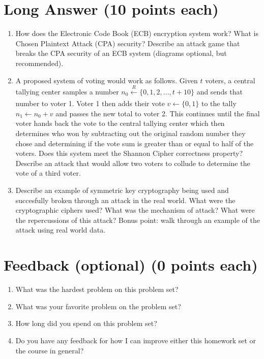\documentclass[11pt]{article}
\begin{document}
\section*{Long Answer (10 points each)}

\begin{enumerate}
    \item How does the Electronic Code Book (ECB) encryption system work? What is Chosen Plaintext Attack (CPA) security? Describe an attack game that breaks the CPA security of an ECB system (diagrams optional, but recommended).
    \item A proposed system of voting would work as follows.  Given \(t\) voters, a central tallying center samples a number \(n_0 \xleftarrow[]{R} \{0, 1, 2, ... , t + 10\}\) and sends that number to voter 1. Voter 1 then adds their vote \(v \leftarrow \{0, 1\}\) to the tally \(n_1 \leftarrow n_0 + v\) and passes the new total to voter 2. This continues until the final voter hands back the vote to the central tallying center which then determines who won by subtracting out the original random number they chose and determining if the vote sum is greater than or equal to half of the voters. Does this system meet the Shannon Cipher correctness property? Describe an attack that would allow two voters to collude to determine the vote of a third voter. 
    \item Describe an example of symmetric key cryptography being used and succesfully broken through an attack in the real world. What were the cryptographic ciphers used? What was the mechanism of attack? What were the repercussions of this attack? Bonus point: walk through an example of the attack using real world data.
\end{enumerate}

\section*{Feedback (optional) (0 points each)}

\begin{enumerate}
    \item What was the hardest problem on this problem set?
    \item What was your favorite problem on the problem set?
    \item How long did you spend on this problem set?
    \item Do you have any feedback for how I can improve either this homework set or the course in general?
\end{enumerate}
\end{document}
